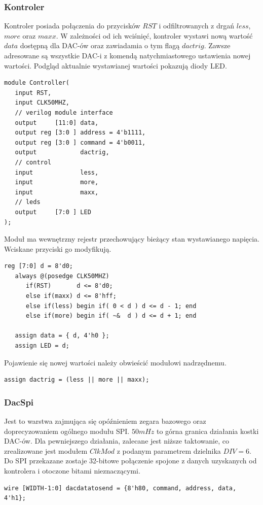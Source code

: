 \documentclass[a4paper,12pt]{article}
\begin{document}
\subsubsection{Kontroler}

Kontroler posiada połączenia do przycisków $RST$ i odfiltrowanych z drgań $less$, $more$ oraz $maxx$. W zależności od ich wciśnięć, kontroler wystawi nową wartość $data$ dostępną dla DAC-ów oraz zawiadamia o tym flagą $dactrig$. Zawsze adresowane są wszystkie DAC-i z komendą natychmiastowego ustawienia nowej wartości. Podgląd aktualnie wystawianej wartości pokazują diody LED.
\begin{lstlisting}[label=Controller,caption=Controller.v]
module Controller(
   input RST,
   input CLK50MHZ,
   // verilog module interface
   output     [11:0] data,
   output reg [3:0 ] address = 4'b1111,
   output reg [3:0 ] command = 4'b0011,
   output            dactrig,
   // control
   input             less,
   input             more,
   input             maxx,
   // leds
   output     [7:0 ] LED
);
\end{lstlisting}

Moduł ma wewnętrzny rejestr przechowujący bieżący stan wystawianego napięcia. Wciskane przyciski go modyfikują.
\begin{lstlisting}[label=Controller,caption=Controller.v,firstnumber=17]
   reg [7:0] d = 8'd0;
   always @(posedge CLK50MHZ)
      if(RST)       d <= 8'd0;
      else if(maxx) d <= 8'hff;
      else if(less) begin if( 0 < d ) d <= d - 1; end
      else if(more) begin if( ~&  d ) d <= d + 1; end

   assign data = { d, 4'h0 };
   assign LED = d;
\end{lstlisting}

Pojawienie się nowej wartości należy obwieścić modułowi nadrzędnemu.
\begin{lstlisting}[label=Controller,caption=Controller.v,firstnumber=27]
   assign dactrig = (less || more || maxx);
\end{lstlisting}

\subsubsection{DacSpi}
Jest to warstwa zajmująca się opóźnieniem zegara bazowego oraz doprecyzowaniem ogólnego modułu SPI. $50mHz$ to górna granica działania kostki DAC-ów. Dla pewniejszego działania, zalecane jest niższe taktowanie, co zrealizowane jest modułem $ClkMod$ z podanym parametrem dzielnika $DIV = 6$. Do SPI przekazane zostaje 32-bitowe połączenie spojone z danych uzyskanych od kontrolera i otoczone bitami nieznaczącymi.
\begin{lstlisting}[label=Controller,caption=Controller.v,firstnumber=32]
   wire [WIDTH-1:0] dacdatatosend = {8'h80, command, address, data, 4'h1};
\end{lstlisting}
\end{document}
